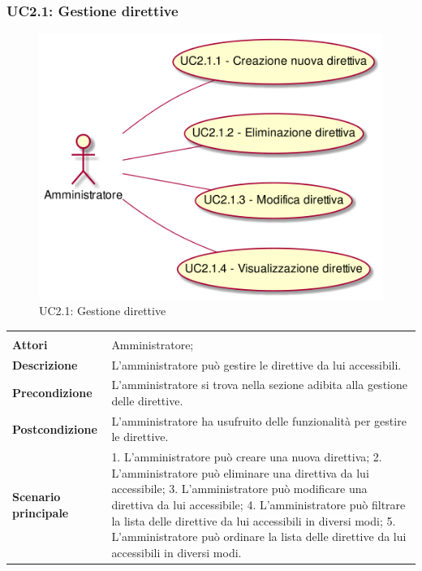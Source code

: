 \subsubsection{UC2.1: Gestione direttive}
\label{UC2.1}\newpage
\begin{figure}[h]
\centering
\includegraphics[width=\textwidth,height=\textheight,keepaspectratio]{images/UseCaseUC2.1.png}
\caption{UC2.1: Gestione direttive}
\end{figure}
\begin{longtable}{l|p{10cm}}
\hline
&\\
\textbf{Attori} & Amministratore;\\[7pt]
\textbf{Descrizione} & L'amministratore può gestire le direttive da lui accessibili.\\[7pt]
\textbf{Precondizione} & L'amministratore si trova nella sezione adibita alla gestione delle direttive.\\[7pt]
\textbf{Postcondizione} & L'amministratore ha usufruito delle funzionalità per gestire le direttive.\\[7pt]
\textbf{Scenario principale} & 1. L'amministratore può creare una nuova direttiva;
2. L'amministratore può eliminare una direttiva da lui accessibile;
3. L'amministratore può modificare una direttiva da lui accessibile;
4. L'amministratore può filtrare la lista delle direttive da lui accessibili in diversi modi;
5. L'amministratore può ordinare la lista delle direttive da lui accessibili in diversi modi.\\[7pt]\hline
\end{longtable}

